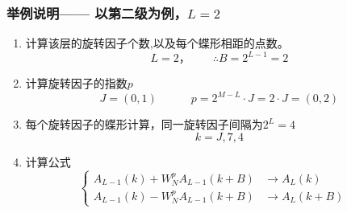 \documentclass[notheorems,compress,mathserif,table]{beamer}
\begin{document}
\begin{frame}[shrink]\frametitle{举例说明—— 以第二级为例，$L=2$}%
\begin{enumerate}
  \item 计算该层的旋转因子个数,以及每个蝶形相距的点数。
        $$L=2，\quad\quad\therefore B=2^{L-1}=2$$
  \item 计算旋转因子的指数$p$
        $$J=(0,1)\quad\quad\quad p=2^{M-L}\cdot J =2\cdot J=(0,2)$$
  \item 每个旋转因子的蝶形计算，同一旋转因子间隔为$2^L=4$
  $$k=J,7,4$$
  \item 计算公式
    $$
        \left\{ \begin{aligned}
        A_{L-1}(k) + W_N^{p}A_{L-1}(k+B) &\longrightarrow A_L(k)\quad\quad\quad\\
        A_{L-1}(k) - W_N^{p}A_{L-1}(k+B) &\longrightarrow A_L(k+B)
        \end{aligned} \right.
    $$

\end{enumerate}
\end{frame}
\end{document}
